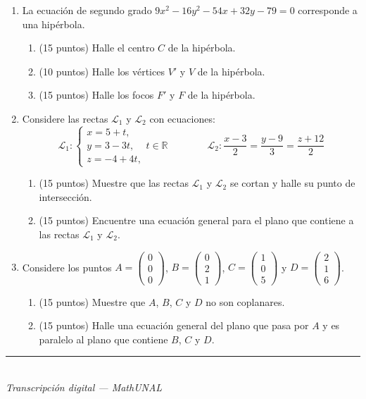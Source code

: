 \documentclass[11pt]{article}
\newcommand{\vectiii}[3]{\begin{pmatrix}#1\\#2\\#3\end{pmatrix}}
\newcommand{\examfooter}{%
  \vfill
  \rule{\linewidth}{0.4pt}\\[1pt]
  {\scriptsize\textit{Transcripción digital --- MathUNAL}\hfill\textcolor{unalblue}{\textbf{\thepage}}}
}
\begin{document}
\begin{enumerate}
\item La ecuación de segundo grado $9x^2-16y^2-54x+32y-79=0$ corresponde a una hipérbola.

\begin{enumerate}[label=(\alph*)]
\item (15 puntos) Halle el centro $C$ de la hipérbola.
\item (10 puntos) Halle los vértices $V'$ y $V$ de la hipérbola.
\item (15 puntos) Halle los focos $F'$ y $F$ de la hipérbola.
\end{enumerate}

\item Considere las rectas $\mathcal{L}_1$ y $\mathcal{L}_2$ con ecuaciones:
$$\mathcal{L}_1:\begin{cases}x=5+t,\\ y=3-3t,\\ z=-4+4t,\end{cases} t\in\mathbb{R}\qquad\qquad \mathcal{L}_2:\frac{x-3}{2}=\frac{y-9}{3}=\frac{z+12}{2}$$

\begin{enumerate}[label=(\alph*)]
\item (15 puntos) Muestre que las rectas $\mathcal{L}_1$ y $\mathcal{L}_2$ se cortan y halle su punto de intersección.
\item (15 puntos) Encuentre una ecuación general para el plano que contiene a las rectas $\mathcal{L}_1$ y $\mathcal{L}_2$.
\end{enumerate}

\item Considere los puntos $A=\vectiii{0}{0}{0}$, $B=\vectiii{0}{2}{1}$, $C=\vectiii{1}{0}{5}$ y $D=\vectiii{2}{1}{6}$.

\begin{enumerate}[label=(\alph*)]
\item (15 puntos) Muestre que $A$, $B$, $C$ y $D$ no son coplanares.
\item (15 puntos) Halle una ecuación general del plano que pasa por $A$ y es paralelo al plano que contiene $B$, $C$ y $D$.
\end{enumerate}

\end{enumerate}

\examfooter
\end{document}
